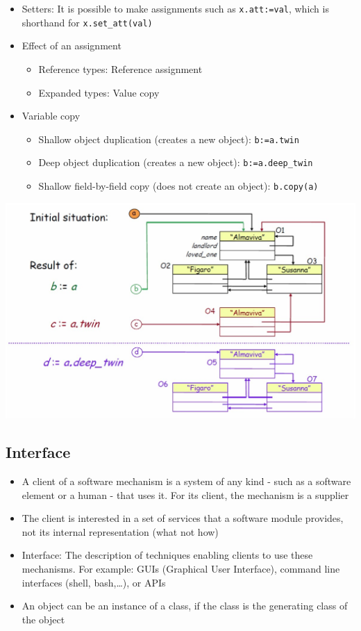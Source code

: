 \documentclass[a4paper]{article}
\newcommand{\inline}[1]{\lstinline!#1!}%
\begin{document}
\begin{itemize}
\begin{itemize}
\begin{itemize}
\end{itemize}
\end{itemize}
\item Setters: It is possible to make assignments such as \inline{x.att:=val}, which is shorthand for \inline{x.set_att(val)}
\item Effect of an assignment
\begin{itemize}
\item Reference types: Reference assignment
\item Expanded types: Value copy
\end{itemize}
\item Variable copy
\begin{itemize}
\item Shallow object duplication (creates a new object): \inline{b:=a.twin}
\item Deep object duplication (creates a new object): \inline{b:=a.deep_twin}
\item Shallow field-by-field copy (does not create an object): \inline{b.copy(a)}
\end{itemize}
\end{itemize}
\begin{center}
\includegraphics[scale=0.27]{Figures/variableCopy.jpg}
\end{center}
\subsection{Interface}
\begin{itemize}
\item A client of a software mechanism is a system of any kind - such as a software element or a human - that uses it. For its client, the mechanism is a supplier
\item The client is interested in a set of services that a software module provides, not its internal representation (what not how)
\item Interface: The description of techniques enabling clients to use these mechanisms. For example: GUIs (Graphical User Interface), command line interfaces (shell, bash,\dots), or APIs
\item An object can be an instance of a class, if the class is the generating class of the object
\end{itemize}
\end{document}
